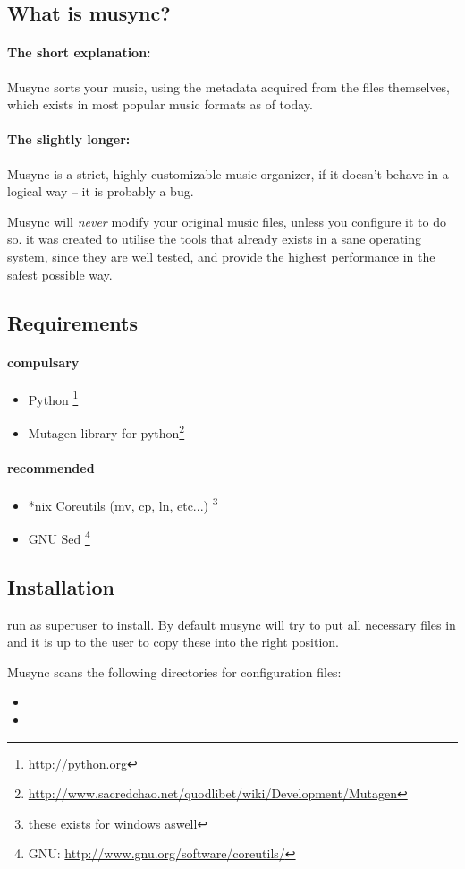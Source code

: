 \subsection{What is musync?}
\paragraph{The short explanation:}
Musync sorts your music, using the metadata acquired from the files themselves, which exists in most popular music formats as of today.

\paragraph{The slightly longer:}
Musync is a strict, highly customizable music organizer, if it doesn't behave in a logical way -- it is probably a bug.

Musync will \emph{never} modify your original music files, unless you configure it to do so.
it was created to utilise the tools that already exists in a sane operating system, since they are well tested, and provide the highest performance in the safest possible way.

\subsection{Requirements}

\paragraph{compulsary}
\begin{itemize}
\item Python \footnote{\url{http://python.org}}
\item Mutagen library for python\footnote{\url{http://www.sacredchao.net/quodlibet/wiki/Development/Mutagen}}
\end{itemize}

\paragraph{recommended}
\begin{itemize}
\item *nix Coreutils (mv, cp, ln, etc...) \footnote{these exists for windows aswell}
\item GNU Sed \footnote{GNU: \url{http://www.gnu.org/software/coreutils/}}
\end{itemize}


\subsection{Installation}

run
as superuser to install. By default musync will try to put all necessary files in
and it is up to the user to copy these into the right position.

Musync scans the following directories for configuration files:
\begin{itemize}
\item {}
\item {}
\end{itemize}
